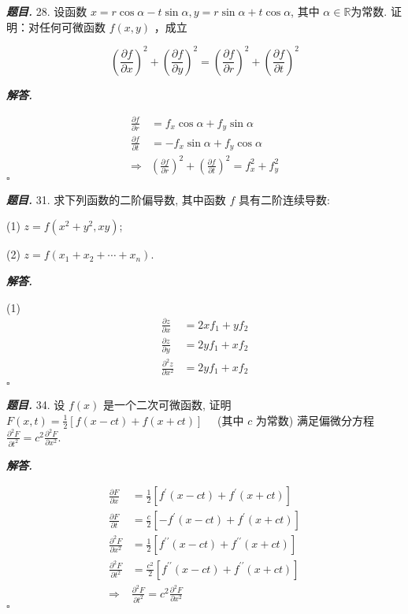 \documentclass[10pt, a4paper, oneside]{ctexart}
\newenvironment{problem}{\begin{framed}\par\noindent\textbf{\textit{题目. }}}{\end{framed}\par}
\newenvironment{solution}{%
  \par\noindent\textbf{\textit{解答. }}\ignorespaces
}{%
  \hfill\ensuremath{\square}\par %
}
\begin{document}
    \begin{problem}
        28. 设函数 $x=r \cos \alpha-t \sin \alpha, y=r \sin \alpha+t \cos \alpha$, 其中 $\alpha \in \mathbb{R}$为常数. 证明：对任何可微函数 $f(x, y)$ ，成立
    
        $$
        \left(\frac{\partial f}{\partial x}\right)^2+\left(\frac{\partial f}{\partial y}\right)^2=\left(\frac{\partial f}{\partial r}\right)^2+\left(\frac{\partial f}{\partial t}\right)^2
        $$    
    \end{problem}
    \begin{solution}
        \begin{align*}
            \frac{\partial f}{\partial r}&=f_x\cos \alpha+f_y\sin \alpha\\
            \frac{\partial f}{\partial t}&=-f_x\sin \alpha+f_y\cos \alpha\\
            \Rightarrow& (\frac{\partial f}{\partial r})^2+(\frac{\partial f}{\partial t})^2=f_x^2+f_y^2
        \end{align*}
    \end{solution}
    
    \begin{problem}
        31. 求下列函数的二阶偏导数, 其中函数 $f$ 具有二阶连续导数:
    
        (1) $z=f\left(x^2+y^2, x y\right)$;
    
        (2) $z=f\left(x_1+x_2+\cdots+x_n\right)$.
    \end{problem}
    \begin{solution}
    (1)
    \begin{align*}
    \frac{\partial z}{\partial x}&=2xf_1+yf_2\\
    \frac{\partial z}{\partial y}&=2yf_1+xf_2\\
    \frac{\partial^2 z}{\partial x^2}&=2yf_1+xf_2\\
    \end{align*}
    \end{solution}
    
    \begin{problem}
    34. 设 $f(x)$ 是一个二次可微函数, 证明
        $F(x, t)=\frac{1}{2}[f(x-c t)+f(x+c t)] \quad$ (其中 $c$ 为常数)
        满足偏微分方程 $\frac{\partial^2 F}{\partial t^2}=c^2 \frac{\partial^2 F}{\partial x^2}$.
    \end{problem}
    \begin{solution}
        \begin{align*}
            \frac{\partial F}{\partial x}&=\frac{1}{2}[f^{\prime}(x-ct)+f^{\prime}(x+ct)]\\ 
            \frac{\partial F}{\partial t}&=\frac{c}{2}[-f^{\prime}(x-ct)+f^{\prime}(x+ct)]\\ 
            \frac{\partial^2 F}{\partial x^2}&=\frac{1}{2}[f^{\prime\prime}(x-ct)+f^{\prime\prime}(x+ct)]\\ 
            \frac{\partial^2 F}{\partial t^2}&=\frac{c^2}{2}[f^{\prime\prime}(x-ct)+f^{\prime\prime}(x+ct)]\\ 
            \Rightarrow& \frac{\partial^2 F}{\partial t^2}=c^2\frac{\partial^2 F}{\partial x^2}
        \end{align*}
    \end{solution}
    
\end{document}
